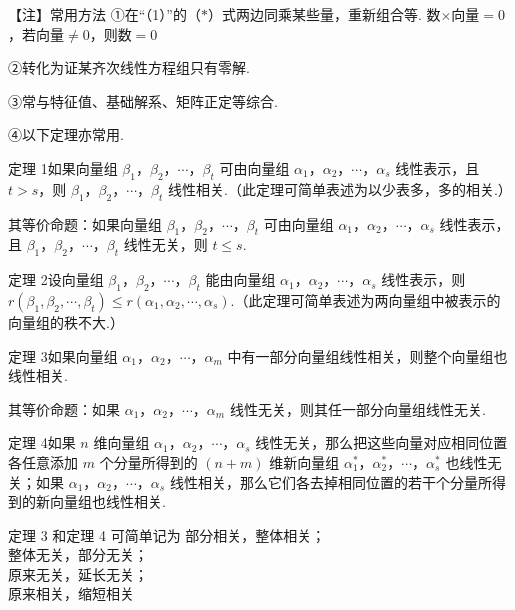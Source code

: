 \begin{fcard}{【注】常用方法}
①在“（1）”的（$*$）式两边同乘某些量，重新组合等. 数$\times$向量$=0$，若向量$\ne0$，则数$=0$

②转化为证某齐次线性方程组只有零解.

③常与特征值、基础解系、矩阵正定等综合.

④以下定理亦常用.

定理 1\quad 如果向量组 $\beta_1$，$\beta_2$，$\cdots$，$\beta_t$ 可由向量组 $\alpha_1$，$\alpha_2$，$\cdots$，$\alpha_s$ 线性表示，且 $t>s$，则 $\beta_1$，$\beta_2$，$\cdots$，$\beta_t$ 线性相关.（此定理可简单表述为以少表多，多的相关.）

其等价命题：如果向量组 $\beta_1$，$\beta_2$，$\cdots$，$\beta_t$ 可由向量组 $\alpha_1$，$\alpha_2$，$\cdots$，$\alpha_s$ 线性表示，且 $\beta_1$，$\beta_2$，$\cdots$，$\beta_t$ 线性无关，则 $t\le s$.

定理 2\quad 设向量组 $\beta_1$，$\beta_2$，$\cdots$，$\beta_t$ 能由向量组 $\alpha_1$，$\alpha_2$，$\cdots$，$\alpha_s$ 线性表示，则 $r(\beta_1,\beta_2,\cdots,\beta_t)\le r(\alpha_1,\alpha_2,\cdots,\alpha_s)$.（此定理可简单表述为两向量组中被表示的向量组的秩不大.）


定理 3\quad 如果向量组 $\alpha_1$，$\alpha_2$，$\cdots$，$\alpha_m$ 中有一部分向量组线性相关，则整个向量组也线性相关.

其等价命题：如果 $\alpha_1$，$\alpha_2$，$\cdots$，$\alpha_m$ 线性无关，则其任一部分向量组线性无关.

定理 4\quad 如果 $n$ 维向量组 $\alpha_1$，$\alpha_2$，$\cdots$，$\alpha_s$ 线性无关，那么把这些向量对应相同位置各任意添加 $m$ 个分量所得到的 $(n+m)$ 维新向量组 $\alpha_1^{*}$，$\alpha_2^{*}$，$\cdots$，$\alpha_s^{*}$ 也线性无关；如果 $\alpha_1$，$\alpha_2$，$\cdots$，$\alpha_s$ 线性相关，那么它们各去掉相同位置的若干个分量所得到的新向量组也线性相关.
\end{fcard}

\begin{fkey}{定理 3 和定理 4 可简单记为}
部分相关，整体相关；\\
整体无关，部分无关；\\
原来无关，延长无关；\\
原来相关，缩短相关
\end{fkey}

